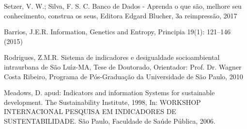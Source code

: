 \documentclass[
12pt,		%
openright,	%
twoside,  %
a4paper,			%
chapter=TITLE,		%
english,			%
french,				%
spanish,			%
brazil				%
]{USPSC-classe/USPSC}
\begin{document}
\begin{flushleft}
\begin{flushleft}
\begin{flushleft}
\begin{flushleft}
 Setzer, V. W.; Silva, F. S. C. Banco de Dados - Aprenda o que s\~ao, melhore seu conhecimento, construa os seus, Editora Edgard Blucher, 3a reimpress\~ao, 2017
\end{flushleft}


\end{flushleft}


\end{flushleft}


\end{flushleft}


\begin{flushleft}
\begin{flushleft}
\begin{flushleft}
\begin{flushleft}
[Barrios, 2015] Barrios, J.E.R. Information, Genetics and Entropy, Principia 19(1): 121–146 (2015)
\end{flushleft}


\end{flushleft}


\end{flushleft}


\end{flushleft}


\begin{flushleft}
\begin{flushleft}
\begin{flushleft}
\begin{flushleft}
[Rodrigues, 2010] Rodrigues, Z.M.R. Sistema de indicadores e desigualdade socioambiental intraurbana de S\~ao Lu\'{\i}z-MA, Tese de Doutorado, Orientador: Prof. Dr. Wagner Costa Ribeiro, Programa de P\'os-Gradua\c{c}\~ao da Universidade de S\~ao Paulo, 2010
\end{flushleft}


\end{flushleft}


\end{flushleft}


\end{flushleft}


\begin{flushleft}
\begin{flushleft}
\begin{flushleft}
\begin{flushleft}
[MEADOWS, 2006] Meadows, D. apud: Indicators and information Systems for sustainable development. The Sustainability Institute, 1998, In: WORKSHOP INTERNACIONAL PESQUISA EM INDICADORES DE SUSTENTABILIDADE. S\~ao Paulo, Faculdade de Sa\'ude P\'ublica, 2006.
\end{flushleft}


\end{flushleft}


\end{flushleft}


\end{flushleft}
\end{document}
